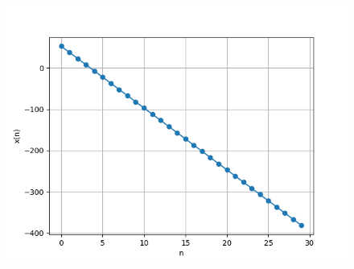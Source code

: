 \documentclass[journal,12pt,twocolumn]{IEEEtran}
\theoremstyle{remark}
\begin{document}
\begin{figure}[h]
      \vspace{-2cm}
      \centering
       \includegraphics[width=0.8\linewidth]{figs/download (4).png} %
        \caption{}
\end{figure}
\end{document}
